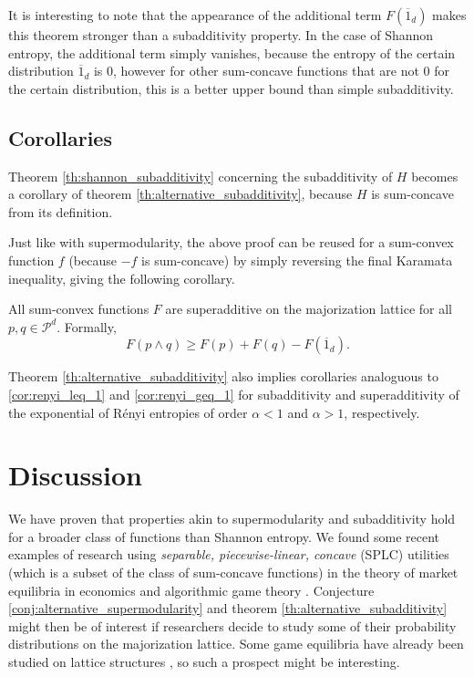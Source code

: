 It is interesting to note that the appearance of the additional term $F(\overline{1}_d)$ makes this theorem stronger than a subadditivity property. In the case of Shannon entropy, the additional term simply vanishes, because the entropy of the certain distribution $\overline{1}_d$ is 0, however for other sum-concave functions that are not 0 for the certain distribution, this is a better upper bound than simple subadditivity.



\subsection{Corollaries}

Theorem \ref{th:shannon_subadditivity} concerning the subadditivity of $H$ becomes a corollary of theorem \ref{th:alternative_subadditivity}, because $H$ is sum-concave from its definition.

Just like with supermodularity, the above proof can be reused for a sum-convex function $f$ (because $-f$ is sum-concave) by simply reversing the final Karamata inequality, giving the following corollary.

\begin{corollary} \label{cor:superadditivity_sum-convex}
    All sum-convex functions $F$ are superadditive on the majorization lattice for all $p, q \in \mathcal{P}^d$. Formally,
    \begin{equation} \label{eq:superadditivity}
        F(p \wedge q) \geq F(p) + F(q) - F(\overline{1}_d).
    \end{equation}
\end{corollary}

Theorem \ref{th:alternative_subadditivity} also implies corollaries analoguous to \ref{cor:renyi_leq_1} and \ref{cor:renyi_geq_1} for subadditivity and superadditivity of the exponential of Rényi entropies of order $\alpha < 1$ and $\alpha > 1$, respectively.



\section{Discussion}

We have proven that properties akin to supermodularity and subadditivity hold for a broader class of functions than Shannon entropy. We found some recent examples of research using \textit{separable, piecewise-linear, concave} (SPLC) utilities (which is a subset of the class of sum-concave functions) in the theory of market equilibria in economics and algorithmic game theory \cite{vazirani_market_2011, anari_nash_2017}. Conjecture \ref{conj:alternative_supermodularity} and theorem \ref{th:alternative_subadditivity} might then be of interest if researchers decide to study some of their probability distributions on the majorization lattice. Some game equilibria have already been studied on lattice structures \cite{agliardi_generalization_2000}, so such a prospect might be interesting.

